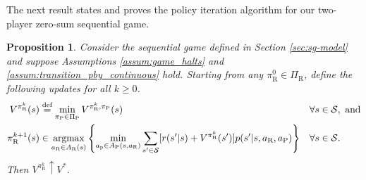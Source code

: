 \documentclass[11pt]{article}
\newtheorem{proposition}{Proposition}
\newcommand{\argmax}{\operatornamewithlimits{argmax}}
\newcommand{\defeq}{\stackrel{\text{def}}{=}}
\begin{document}
    The next result states and proves the policy iteration algorithm for our two-player zero-sum sequential game.
       \begin{proposition}
           \label{lem:policy_iteration}
           Consider the sequential game defined in Section \ref{sec:sg-model} and suppose Assumptions \ref{assum:game_halts} and \ref{assum:transition_pby_continuous} hold. Starting from any $\pi_\text{R}^0 \in \Pi_\text{R}$, define the following updates for all $k \geq 0$.
           \begin{align*}
              V^{\pi_{\text{R}}^k}(s) &\defeq \min_{\pi_\text{P} \in \Pi_\text{P}} V^{\pi_\text{R}^k,\pi_\text{P}}(s) && \forall s \in \mathcal{S}, \mbox{ and}\\
              \label{eqn:update-policy-two-player}
              \pi_\text{R}^{k+1}(s) &\in \argmax_{a_\text{R} \in A_\text{R}(s)} \left\{\min_{a_\text{p} \in A_\text{P}(s,a_\text{R})}\sum_{s' \in \mathcal{S}}[r(s'|s) + V^{\pi_{\text{R}}^k}(s')] p(s'|s,a_\text{R},a_\text{P})\right\} && \forall s \in \mathcal{S}.
            \end{align*}
            Then $V^{\pi_\text{R}^k} \uparrow V^*$. 
       \end{proposition}
\end{document}
